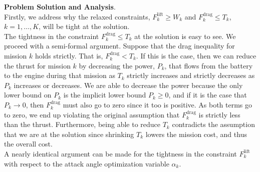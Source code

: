 \documentclass[12pt,reqno]{article}
\theoremstyle{definition}
\numberwithin{equation}{section}
\begin{document}
    \noindent\textbf{Problem Solution and Analysis}.\\
    \noindent Firstly, we address why the relaxed constraints, $F_{k}^{\mathrm{lift}} \ge W_k$ and $F_{k}^{\mathrm{drag}} \le T_k$,
    $k=1, \ldots, K$, will be tight at the solution.\\
    The tightness in the constraint $F_{k}^{\mathrm{drag}} \le T_k$ at the solution is easy to see. We proceed with a semi-formal argument.
    Suppose that the drag inequality for mission $k$ holds strictly. That is, $F_k^{\mathrm{drag}} < T_k$. If this is the case, then we can
    reduce the thrust for mission $k$ by decreasing the power, $P_k$, that flows from the battery to the engine
    during that mission as $T_k$ strictly increases and strictly decreases as $P_k$ increases or decreases.
    We are able to decrease the power because the only lower bound on $P_k$ is the implicit lower bound $P_k \ge 0$,
    and if it is the case that $P_k \to 0$, then $F_k^{\mathrm{drag}}$ must also go to zero since it too is positive. 
    As both terms go to zero, we end up violating the original assumption that $F_k^{\mathrm{drag}}$ is strictly less than the
    thrust. Furthermore, being able to reduce $T_k$ contradicts the assumption that we are at the solution since shrinking $T_k$
    lowers the mission cost, and thus the overall cost. \\
    \noindent A nearly identical argument can be made for the tightness in the constraint $F_k^{\mathrm{lift}}$ with
    respect to the attack angle optimization variable $\alpha_k$.
\end{document}
